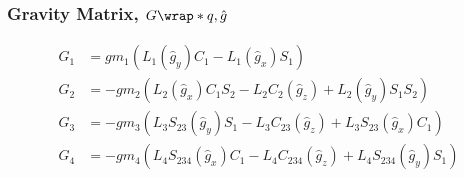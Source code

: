 \subsubsection{Gravity Matrix, $G\wrap*{q,\hat{g}}$}
\begin{equation}
	\begin{split}
	G_{1}  &=  g m_{1} (L_{1} (\hat{g}_{y}) C_{1} - L_{1} (\hat{g}_{x}) S_{1}) \\
	G_{2}  &= -g m_{2} (L_{2} (\hat{g}_{x}) C_{1} S_{2} - L_{2} C_{2} (\hat{g}_{z}) + L_{2} (\hat{g}_{y}) S_{1} S_{2}) \\
	G_{3}  &= -g m_{3} (L_{3} S_{23} (\hat{g}_{y}) S_{1} - L_{3} C_{23} (\hat{g}_{z}) + L_{3} S_{23} (\hat{g}_{x}) C_{1}) \\
	G_{4}  &= -g m_{4} (L_{4} S_{234} (\hat{g}_{x}) C_{1} - L_{4} C_{234} (\hat{g}_{z}) + L_{4} S_{234} (\hat{g}_{y}) S_{1})
	\end{split}
\end{equation}

